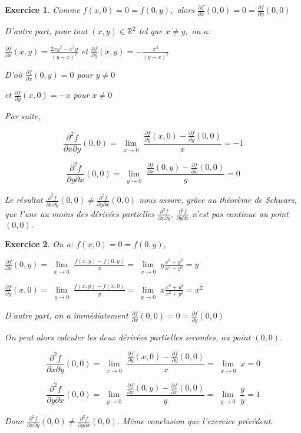 \documentclass[11pt,a4paper]{report}
\newtheorem{exo}{Exercice}[section]
\begin{document}
\begin{exo}
Comme $f(x,0)=0=f(0,y),$ alors $\frac{\partial f}{\partial x}(0,0)=0=\frac{\partial f}{\partial y}(0,0)$

D'autre part, pour tout $(x,y)\in\mathbb{R}^2$ tel que $x\neq y,$ on a:

$\frac{\partial f}{\partial x}(x,y)=\frac{2xy^2-x^2 y}{(y-x)^2}$ et $\frac{\partial f}{\partial y}(x,y)=-\frac{x^3}{(y-x)^2}$

D'où $\frac{\partial f}{\partial x}(0,y)=0$ pour $y\neq 0$

et $\frac{\partial f}{\partial y}(x,0)=-x$ pour $x\neq0$

Par suite,

$$\frac{\partial^2 f}{\partial x \partial y}(0,0)=\lim\limits_{\substack{x\rightarrow0}}\frac{\frac{\partial f}{\partial y}(x,0)-\frac{\partial f}{\partial y}(0,0)}{x}=-1$$

$$\frac{\partial^2 f}{\partial y \partial x}(0,0)=\lim\limits_{\substack{y\rightarrow0}}\frac{\frac{\partial f}{\partial x}(0,y)-\frac{\partial f}{\partial x}(0,0)}{y}=0$$

Le résultat $\frac{\partial^2 f}{\partial x \partial y}(0,0)\neq\frac{\partial^2 f}{\partial y \partial x}(0,0)$ nous assure, grâce au théorème de Schwarz, que l'une au moins des dérivées partielles $\frac{\partial^2 f}{\partial x \partial y},\,\frac{\partial^2 f}{\partial y \partial x}$ n'est pas continue au point $(0,0).$
\end{exo}
\begin{exo}
On a:
$f(x,0)=0=f(0,y),$

$\frac{\partial f}{\partial x}(0,y)=\lim\limits_{\substack{x\rightarrow0}}\frac{f(x,y)-f(0,y)}{x}=\lim\limits_{\substack{x\rightarrow0}}y\frac{x^3+y^2}{x^2+y^2}=y$

$\frac{\partial f}{\partial y}(x,0)=\lim\limits_{\substack{y\rightarrow0}}\frac{f(x,y)-f(x,0)}{y}=\lim\limits_{\substack{y\rightarrow0}}x\frac{x^3+y^2}{x^2+y^2}=x^2$

D'autre part, on a immédiatement $\frac{\partial f}{\partial x}(0,0)=0=\frac{\partial f}{\partial y}(0,0)$

On peut alors calculer les deux dérivées partielles secondes, au point $(0,0).$

$$\frac{\partial^2 f}{\partial x \partial y}(0,0)=\lim\limits_{\substack{x\rightarrow0}}\frac{\frac{\partial f}{\partial y}(x,0)-\frac{\partial f}{\partial y}(0,0)}{x}=\lim\limits_{\substack{x\rightarrow0}}x=0$$

$$\frac{\partial^2 f}{\partial y \partial x}(0,0)=\lim\limits_{\substack{y\rightarrow0}}\frac{\frac{\partial f}{\partial x}(0,y)-\frac{\partial f}{\partial x}(0,0)}{y}=\lim\limits_{\substack{y\rightarrow0}}\frac{y}{y}=1$$

Donc $\frac{\partial^2 f}{\partial x \partial y}(0,0)\neq\frac{\partial^2 f}{\partial y \partial x}(0,0).$ Même conclusion que l'exercice précédent.


\end{exo}
\end{document}
